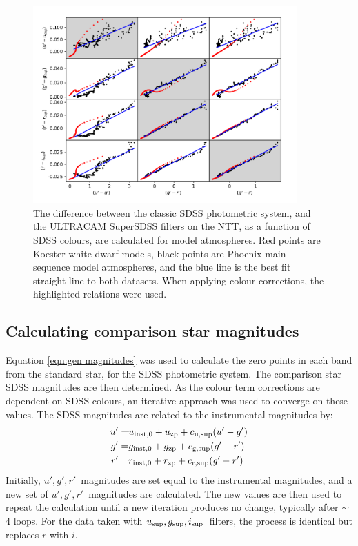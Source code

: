 \begin{figure}
    \centering
    \includegraphics[width=0.9\textwidth]{figures/three_cvs_with_weird_colours/GeneralFigs/colour_term_tracks.pdf}
    \caption{The difference between the classic SDSS photometric system, and the ULTRACAM SuperSDSS filters on the NTT, as a function of SDSS colours, are calculated for model atmospheres. Red points are Koester white dwarf models, black points are Phoenix main sequence model atmospheres, and the blue line is the best fit straight line to both datasets. When applying colour corrections, the highlighted relations were used.}
    \label{fig:all colour corrections}
\end{figure}

\subsection{Calculating comparison star magnitudes}
\label{sect:comparison star mag calc}

Equation \ref{eqn:gen magnitudes} was used to calculate the zero points in each band from the standard star, for the SDSS photometric system.
The comparison star SDSS magnitudes are then determined. As the colour term corrections are dependent on SDSS colours, an iterative approach was used to converge on these values. The SDSS magnitudes are related to the instrumental magnitudes by:
\begin{align*}
    u' =& u_{\rm inst,0} + u_{\rm zp} + c_{\rm u, sup}(u' - g') \\
    g' =& g_{\rm inst,0} + g_{\rm zp} + c_{\rm g, sup}(g' - r') \\
    r' =& r_{\rm inst,0} + r_{\rm zp} + c_{\rm r, sup}(g' - r')
\end{align*}
Initially, $u',g',r'$\ magnitudes are set equal to the instrumental magnitudes, and a new set of $u',g',r'$\ magnitudes are calculated. The new values are then used to repeat the calculation until a new iteration produces no change, typically after $\sim$4 loops. For the data taken with $u_{\rm sup},g_{\rm sup},i_{\rm sup}$\ filters, the process is identical but replaces $r$ with $i$.


